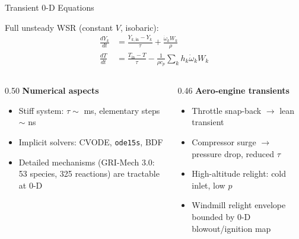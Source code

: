 \documentclass[12pt,aspectratio=169]{beamer}
\newcommand{\taures}{\tau}
\newcommand{\ddt}[1]{\frac{d#1}{dt}}
\newcommand{\Vr}{V}
\newcommand{\Tin}{T_{\text{in}}}
\begin{document}
\begin{frame}{Transient 0-D Equations}

  Full unsteady WSR (constant $\Vr$, isobaric):
  \begin{align}
    \ddt{Y_k} &= \frac{Y_{k,\text{in}}-Y_k}{\taures}
                 + \frac{\dot{\omega}_k W_k}{\rho} \\[8pt]
    \ddt{T}   &= \frac{\Tin-T}{\taures}
                 - \frac{1}{\rho c_p}\sum_k h_k \dot{\omega}_k W_k
  \end{align}

  \begin{columns}[t]
    \begin{column}{0.50\textwidth}
      \textbf{Numerical aspects}
      \begin{itemize}
        \item Stiff system: $\taures \sim$ ms, elementary steps $\sim$ ns
        \item Implicit solvers: CVODE, \texttt{ode15s}, BDF
        \item Detailed mechanisms (GRI-Mech 3.0: 53 species, 325 reactions)
              are tractable at 0-D
      \end{itemize}
    \end{column}
    \begin{column}{0.46\textwidth}
      \textbf{Aero-engine transients}
      \begin{itemize}
        \item Throttle snap-back $\to$ lean transient
        \item Compressor surge $\to$ pressure drop, reduced $\taures$
        \item High-altitude relight: cold inlet, low $p$
        \item Windmill relight envelope bounded by 0-D blowout/ignition map
      \end{itemize}
    \end{column}
  \end{columns}
\end{frame}
\end{document}
